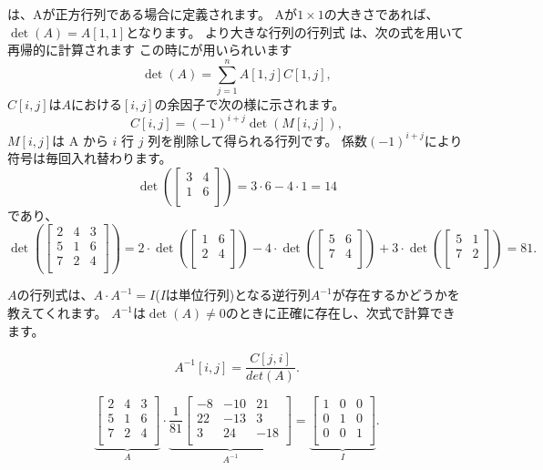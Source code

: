 
は、Aが正方行列である場合に定義されます。
Aが$1 \times 1$の大きさであれば、$\det(A)=A[1,1]$となります。
より大きな行列の行列式 は、次の式を用いて再帰的に計算されます
この時にが用いられいます
\[\det(A)=\sum_{j=1}^n A[1,j] C[1,j],\]
$C[i,j]$は$A$における$[i,j]$の余因子で次の様に示されます。
\[C[i,j] = (-1)^{i+j} \det(M[i,j]),\]
$M[i,j]$は A から $i$ 行 $j$ 列を削除して得られる行列です。
係数$(-1)^{i+j}$により符号は毎回入れ替わります。
\[
\det(
 \begin{bmatrix}
  3 & 4 \\
  1 & 6 \\
 \end{bmatrix}
) = 3 \cdot 6 - 4 \cdot 1 = 14
\]
であり、
\[
\det(
 \begin{bmatrix}
  2 & 4 & 3 \\
  5 & 1 & 6 \\
  7 & 2 & 4 \\
 \end{bmatrix}
) =
2 \cdot
\det(
 \begin{bmatrix}
  1 & 6 \\
  2 & 4 \\
 \end{bmatrix}
)
-4 \cdot
\det(
 \begin{bmatrix}
  5 & 6 \\
  7 & 4 \\
 \end{bmatrix}
)
+3 \cdot
\det(
 \begin{bmatrix}
  5 & 1 \\
  7 & 2 \\
 \end{bmatrix}
) = 81.
\]


$A$の行列式は、$A \cdot A^{-1} = I$($I$は単位行列)となる逆行列$A^{-1}$が存在するかどうかを教えてくれます。
$A^{-1}$は$\det(A) \neq 0$のときに正確に存在し、次式で計算できます。

\[A^{-1}[i,j] = \frac{C[j,i]}{det(A)}.\]

\[
\underbrace{
 \begin{bmatrix}
  2 & 4 & 3\\
  5 & 1 & 6\\
  7 & 2 & 4\\
 \end{bmatrix}
}_{A}
\cdot
\underbrace{
 \frac{1}{81}
 \begin{bmatrix}
   -8 & -10 & 21 \\
   22 & -13 & 3 \\
   3 & 24 & -18 \\
 \end{bmatrix}
}_{A^{-1}}
=
\underbrace{
 \begin{bmatrix}
  1 & 0 & 0 \\
  0 & 1 & 0 \\
  0 & 0 & 1 \\
 \end{bmatrix}
}_{I}.
\]

